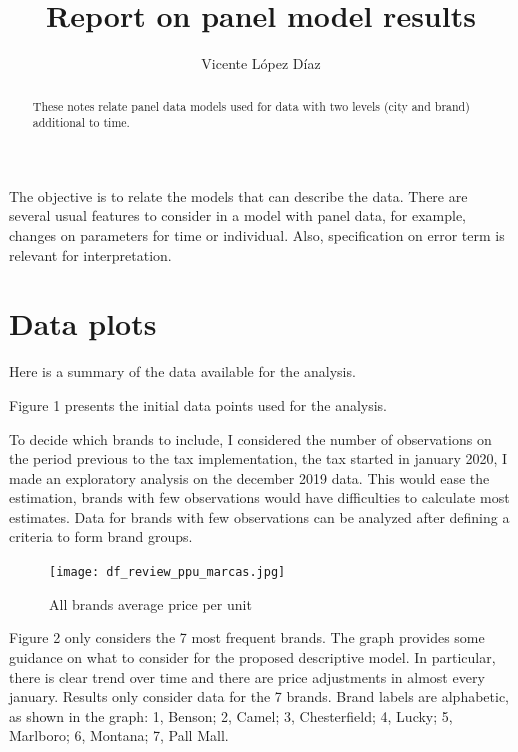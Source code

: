 \documentclass[]{article}
\title{Report on panel model results}
\author{Vicente López Díaz}
\begin{document}
\maketitle

\begin{abstract}
These notes relate panel data models used for data with two levels (city and brand) additional to time.
\end{abstract}

The objective is to relate the models that can describe the data. There are several usual features to consider in a model with panel data, for example, changes on parameters for time or individual. Also, specification on error term is relevant for interpretation.

\section{Data plots}
Here is a summary of the data available for the analysis. 

Figure 1 presents the initial data points used for the analysis.

To decide which brands to include, I considered the number of observations on the period previous to the tax implementation, the tax started in january 2020, I made an exploratory analysis on the december 2019 data. This would ease the estimation, brands with few observations would have difficulties to calculate most estimates. Data for brands with few observations can be analyzed after defining a criteria to form brand groups.

\begin{figure}
\begin{center}
		\texttt{[image: df\_review\_ppu\_marcas.jpg]} 
\end{center}
 \caption{All brands average price per unit}
\end{figure}

Figure 2 only considers the 7 most frequent brands. The graph provides some guidance on what to consider for the proposed descriptive model.  In particular, there is clear trend over time and there are price adjustments in almost every january. 
Results only consider data for the 7 brands. Brand labels are alphabetic, as shown in the graph: 1, Benson; 2, Camel; 3, Chesterfield; 4, Lucky; 5, Marlboro; 6, Montana; 7, Pall Mall.
\end{document}
